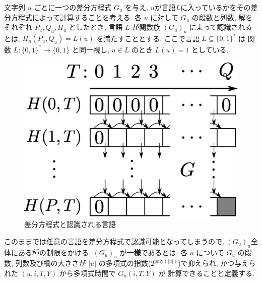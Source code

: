 文字列 $u$ ごとに一つの差分方程式 $G _u$ を与え,
$u$が言語$L$に入っているかをその差分方程式によって計算することを考える.
各 $u$ に対して $G_u$ の段数と列数, 解をそれぞれ $P_u, Q_u, H_u$ としたとき,
言語 $L$ が関数族 $(G_u)_u$ によって認識されるとは,
$H_u(P_u, Q_u) = L(u)$ を満たすこととする.
ここで言語 $L \subseteq \{0, 1\} ^*$ は
関数 $L \colon \{0, 1\} ^* \to \{0, 1\}$ と同一視し, 
$u \in L$ のとき $L (u) = 1$ としている. 

 \begin{figure}
  \label{fig:divp}
  \begin{center}
   \includegraphics[height=0.2\textheight]{image/divp.eps}
  \end{center}
  \caption{差分方程式と認識される言語}
 \end{figure}

このままでは任意の言語を差分方程式で認識可能となってしまうので, $(G_u)_u$全体にある種の制限をかける.
$(G_u)_u$ が{\bf 一様}であるとは,
各 $u$ について $G _u$ の段数, 列数及び欄の大きさが $|u|$ の多項式の指数($2^{\mathrm{poly} (|u|)}$)で抑えられ, 
かつ与えられた $(u, i, T, Y)$ から多項式時間で $G_u(i, T, Y)$ が
計算できることと定義する.

